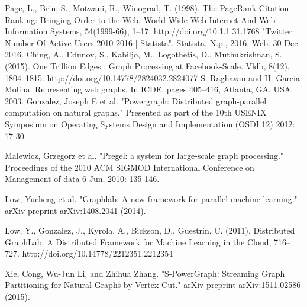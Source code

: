 \documentclass[12pt]{report}
\numberwithin{figure}{section}
\numberwithin{table}{section}
\begin{document}
\begin{thebibliography}{1}

   Page, L., Brin, S., Motwani, R.,  Winograd, T. (1998). The PageRank Citation Ranking: Bringing Order to the Web. World Wide Web Internet And Web Information Systems, 54(1999-66), 1–17. http://doi.org/10.1.1.31.1768
   "Twitter: Number Of Active Users 2010-2016 | Statista". Statista. N.p., 2016. Web. 30 Dec. 2016.
   Ching, A., Edunov, S., Kabiljo, M., Logothetis, D.,  Muthukrishnan, S. (2015). One Trillion Edges : Graph Processing at Facebook-Scale. Vldb, 8(12), 1804–1815. http://doi.org/10.14778/2824032.2824077
   S. Raghavan and H. Garcia-Molina. Representing web graphs. In ICDE, pages 405–416, Atlanta, GA, USA, 2003.
   Gonzalez, Joseph E et al. "Powergraph: Distributed graph-parallel computation on natural graphs." Presented as part of the 10th USENIX Symposium on Operating Systems Design and Implementation (OSDI 12) 2012: 17-30.

    Malewicz, Grzegorz et al. "Pregel: a system for large-scale graph processing." Proceedings of the 2010 ACM SIGMOD International Conference on Management of data 6 Jun. 2010: 135-146.

   Low, Yucheng et al. "Graphlab: A new framework for parallel machine learning." arXiv preprint arXiv:1408.2041 (2014).
  
   Low, Y., Gonzalez, J., Kyrola, A., Bickson, D.,  Guestrin, C. (2011). Distributed GraphLab: A Distributed Framework for Machine Learning in the Cloud, 716–727. http://doi.org/10.14778/2212351.2212354
  
   Xie, Cong, Wu-Jun Li, and Zhihua Zhang. "S-PowerGraph: Streaming Graph Partitioning for Natural Graphs by Vertex-Cut." arXiv preprint arXiv:1511.02586 (2015).
  

\end{thebibliography}
\end{document}
